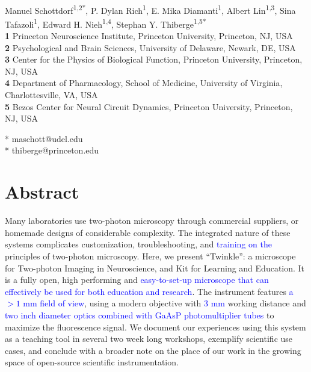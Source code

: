 \documentclass[10pt,letterpaper]{article}
\begin{document}
\vspace*{0.2in}

\begin{flushleft}
{\Large
\textbf{}
}
\newline
\\
Manuel Schottdorf\textsuperscript{1,2*}, %
P. Dylan Rich\textsuperscript{1}, %
E. Mika Diamanti\textsuperscript{1}, %
Albert Lin\textsuperscript{1,3}, %
Sina Tafazoli\textsuperscript{1}, %
Edward H. Nieh\textsuperscript{1,4}, %
Stephan Y. Thiberge\textsuperscript{1,5*} %
\\
\bigskip
\textbf{1} Princeton Neuroscience Institute, Princeton University, Princeton, NJ, USA\\
\textbf{2} Psychological and Brain Sciences, University of Delaware, Newark, DE, USA\\
\textbf{3} Center for the Physics of Biological Function, Princeton University, Princeton, NJ, USA\\
\textbf{4} Department of Pharmacology, School of Medicine, University of Virginia, Charlottesville, VA, USA \\
\textbf{5} Bezos Center for Neural Circuit Dynamics, Princeton University, Princeton, NJ, USA\\
\bigskip

* maschott@udel.edu\\
* thiberge@princeton.edu

\end{flushleft}
\section*{Abstract}
Many laboratories use two-photon microscopy through commercial suppliers, or homemade designs of considerable complexity. The integrated nature of these systems complicates customization, troubleshooting, and \textcolor{blue}{training on the} principles of two-photon microscopy. Here, we present ``Twinkle'': a microscope for Two-photon Imaging in Neuroscience, and Kit for Learning and Education. It is a fully open, high performing and \textcolor{blue}{easy-to-set-up microscope that can effectively be used for both education and research}. The instrument features \textcolor{blue}{a $>1\text{ mm}$ field of view}, using a modern objective with \textcolor{blue}{3 mm} working distance and \textcolor{blue}{two inch diameter optics combined with GaAsP photomultiplier tubes} to maximize the fluorescence signal. We document our experiences using this system as a teaching tool in several two week long workshops, exemplify scientific use cases, and conclude with a broader note on the place of our work in the growing space of open-source scientific instrumentation.
\end{document}
